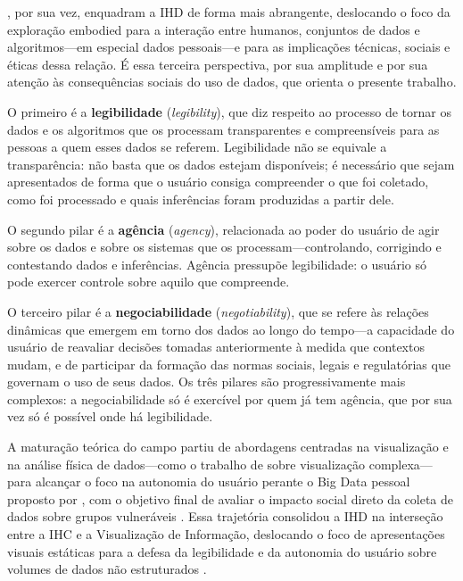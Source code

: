 \documentclass[
	12pt,				%
	oneside,			%
	a4paper,			%
	english,			%
	brazil				%
	]{abntex2ppgsi}
\begin{document}
    , por sua vez, enquadram a IHD de forma mais abrangente, deslocando o foco da exploração embodied para a interação entre humanos, conjuntos de dados e algoritmos---em especial dados pessoais---e para as implicações técnicas, sociais e éticas dessa relação. É essa terceira perspectiva, por sua amplitude e por sua atenção às consequências sociais do uso de dados, que orienta o presente trabalho.

    O primeiro é a \textbf{legibilidade} (\textit{legibility}), que diz respeito ao processo de tornar os dados e os algoritmos que os processam transparentes e compreensíveis para as pessoas a quem esses dados se referem. Legibilidade não se equivale a transparência: não basta que os dados estejam disponíveis; é necessário que sejam apresentados de forma que o usuário consiga compreender o que foi coletado, como foi processado e quais inferências foram produzidas a partir dele.

    O segundo pilar é a \textbf{agência} (\textit{agency}), relacionada ao poder do usuário de agir sobre os dados e sobre os sistemas que os processam---controlando, corrigindo e contestando dados e inferências. Agência pressupõe legibilidade: o usuário só pode exercer controle sobre aquilo que compreende.

    O terceiro pilar é a \textbf{negociabilidade} (\textit{negotiability}), que se refere às relações dinâmicas que emergem em torno dos dados ao longo do tempo---a capacidade do usuário de reavaliar decisões tomadas anteriormente à medida que contextos mudam, e de participar da formação das normas sociais, legais e regulatórias que governam o uso de seus dados. Os três pilares são progressivamente mais complexos: a negociabilidade só é exercível por quem já tem agência, que por sua vez só é possível onde há legibilidade.

    A maturação teórica do campo partiu de abordagens centradas na visualização e na análise física de dados---como o trabalho de  sobre visualização complexa---para alcançar o foco na autonomia do usuário perante o Big Data pessoal proposto por , com o objetivo final de avaliar o impacto social direto da coleta de dados sobre grupos vulneráveis \cite{Hornung2015}. Essa trajetória consolidou a IHD na interseção entre a IHC e a Visualização de Informação, deslocando o foco de apresentações visuais estáticas para a defesa da legibilidade e da autonomia do usuário sobre volumes de dados não estruturados \cite{VICTORELLI2020Understanding}.
\end{document}

